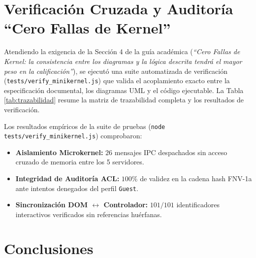 \documentclass[10pt,twocolumn,letterpaper]{article}
\begin{document}
\section{Verificaci\'on Cruzada y Auditor\'ia ``Cero Fallas de Kernel''}

Atendiendo la exigencia de la Secci\'on 4 de la gu\'ia acad\'emica (\textit{``Cero Fallas de Kernel: la consistencia entre los diagramas y la l\'ogica descrita tendr\'a el mayor peso en la calificaci\'on''}), se ejecut\'o una suite automatizada de verificaci\'on (\texttt{tests/verify\_minikernel.js}) que valida el acoplamiento exacto entre la especificaci\'on documental, los diagramas UML y el c\'odigo ejecutable. La Tabla \ref{tab:trazabilidad} resume la matriz de trazabilidad completa y los resultados de verificaci\'on.

Los resultados emp\'iricos de la suite de pruebas (\texttt{node tests/verify\_minikernel.js}) comprobaron:
\begin{itemize}[leftmargin=*,nosep]
  \item \textbf{Aislamiento Microkernel:} $26$ mensajes IPC despachados sin acceso cruzado de memoria entre los 5 servidores.
  \item \textbf{Integridad de Auditor\'ia ACL:} $100\%$ de validez en la cadena hash FNV-1a ante intentos denegados del perfil \texttt{Guest}.
  \item \textbf{Sincronizaci\'on DOM $\leftrightarrow$ Controlador:} $101/101$ identificadores interactivos verificados sin referencias hu\'erfanas.
\end{itemize}

\section{Conclusiones}
\end{document}
